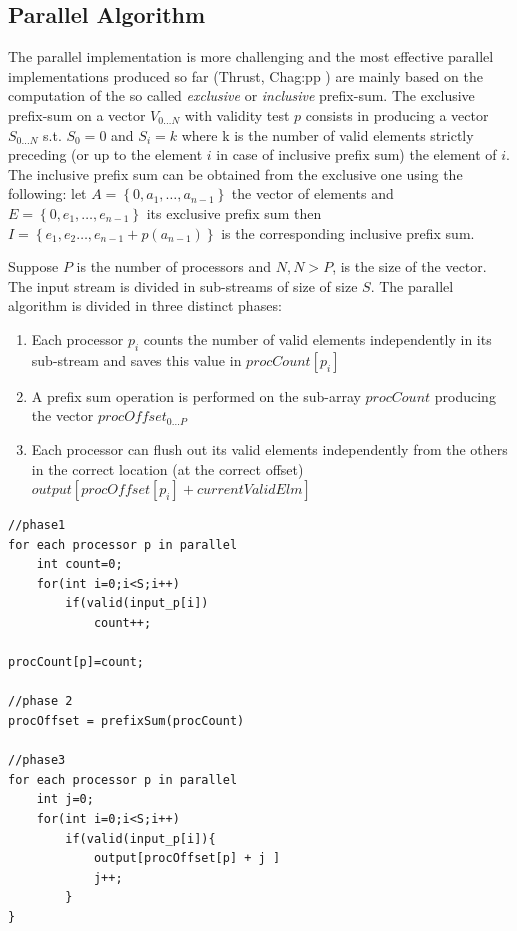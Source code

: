 \subsection{Parallel Algorithm}
\label{sec:stream_compaction_parallel}
The parallel implementation is more challenging and the most effective parallel implementations produced so far (Thrust\cite{Thrust}, Chag:pp \cite{Billetter:2009}) are mainly based on the computation of the so called \textit{exclusive} or \textit{inclusive} prefix-sum. The exclusive prefix-sum on a vector \(V_{0\ldots N}\) with validity test \(p\) consists in producing a vector \(S_{0\ldots N}\) s.t. \(S_0 = 0\) and \(S_i=k\) where k is the number of valid elements strictly preceding (or up to the element \(i\) in case of inclusive prefix sum) the element of \(i\). The inclusive prefix sum can be obtained from the exclusive one using the following: let \(A=\left\{0,a_1,\ldots,a_{n-1}\right\}\) the vector of elements and \(E=\left\{0,e_1,\ldots,e_{n-1}\right\}\) its exclusive prefix sum then \(I=\left\{e_1,e_2\ldots, e_{n-1}+p(a_{n-1}) \right\}\) is the corresponding inclusive prefix sum.

Suppose \(P\) is the number of processors and \(N, N>P\), is the size of the vector. The input stream is divided in sub-streams  of size of size \(S\). The parallel algorithm is divided in three distinct phases:

\begin{enumerate}
	\item Each processor \(p_i\) counts the number of valid elements independently in its sub-stream and saves this value in \(procCount[p_i]\)
	\item A prefix sum operation is performed on the sub-array \(procCount\) producing the vector \(procOffset_{0\ldots P}\)
	\item Each processor can flush out its valid elements independently from the others in the correct location (at the correct offset) \(output[procOffset[p_i]+currentValidElm]\)
\end{enumerate}
\begin{lstlisting}
//phase1
for each processor p in parallel
	int count=0;
	for(int i=0;i<S;i++)
		if(valid(input_p[i])
			count++;

procCount[p]=count;

//phase 2
procOffset = prefixSum(procCount)

//phase3
for each processor p in parallel
	int j=0;
	for(int i=0;i<S;i++)
		if(valid(input_p[i]){
			output[procOffset[p] + j ]
			j++;
		}
}	
\end{lstlisting}

